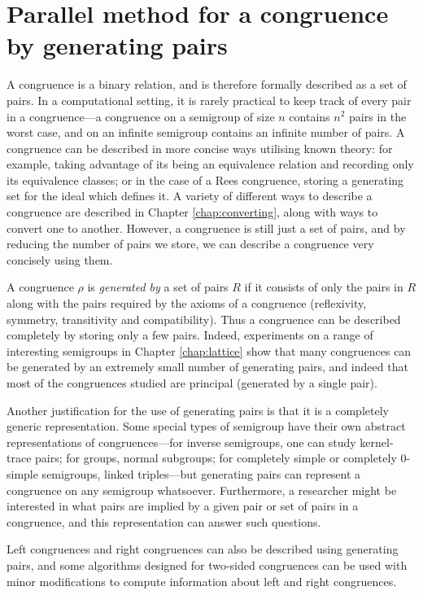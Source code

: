 \chapter{Parallel method for a congruence by generating pairs}
\label{chap:pairs}

A congruence is a binary relation, and is therefore formally described as a set
of pairs.  In a computational setting, it is rarely practical to keep track of
every pair in a congruence---a congruence on a semigroup of size $n$ contains
$n^2$ pairs in the worst case, and on an infinite semigroup contains an infinite
number of pairs.  A congruence can be described in more concise ways utilising
known theory: for example, taking advantage of its being an equivalence relation
and recording only its equivalence classes; or in the case of a Rees congruence,
storing a generating set for the ideal which defines it.  A variety of different
ways to describe a congruence are described in Chapter \ref{chap:converting},
along with ways to convert one to another.  However, a congruence is still just
a set of pairs, and by reducing the number of pairs we store, we can describe a
congruence very concisely using them.

A congruence $\rho$ is \textit{generated by} a set of pairs $R$ if it consists
of only the pairs in $R$ along with the pairs required by the axioms of a
congruence (reflexivity, symmetry, transitivity and compatibility).  Thus a
congruence can be described completely by storing only a few pairs.
Indeed, experiments on a range of interesting semigroups in Chapter
\ref{chap:lattice} show that many congruences can be generated by an extremely
small number of generating pairs, and indeed that most of the congruences
studied are principal (generated by a single pair). %

Another justification for the use of generating pairs is that it is a completely
generic representation.  Some special types of semigroup have their own abstract
representations of congruences---for inverse semigroups, one can study
kernel-trace pairs; for groups, normal subgroups; for completely simple or
completely 0-simple semigroups, linked triples---but generating pairs can
represent a congruence on any semigroup whatsoever.  Furthermore, a researcher
might be interested in what pairs are implied by a given pair or set of pairs in
a congruence, and this representation can answer such questions.

Left congruences and right congruences can also be described using generating
pairs, and some algorithms designed for two-sided congruences can be used with
minor modifications to compute information about left and right congruences.

